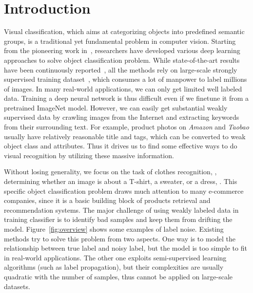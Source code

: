 \documentclass[10pt,twocolumn,letterpaper]{article}
\begin{document}
\section{Introduction} %
\label{sec:introduction}
Visual classification, which aims at categorizing objects into predefined semantic groups, is a traditional yet fundamental problem in computer vision. Starting from the pioneering work in~\cite{krizhevsky2012imagenet}, researchers have developed various deep learning approaches to solve object classification problem. While state-of-the-art results have been continuously reported~\cite{zeiler2013visualizing,simonyan2014very,szegedy2014going}, all the methods rely on large-scale strongly supervised training dataset~\cite{deng2009imagenet}, which consumes a lot of manpower to label millions of images. In many real-world applications, we can only get limited well labeled data. Training a deep neural network is thus difficult even if we finetune it from a pretrained ImageNet model. However, we can easily get substantial weakly supervised data by crawling images from the Internet and extracting keywords from their surrounding text. For example, product photos on \emph{Amazon} and \emph{Taobao} usually have relatively reasonable title and tags, which can be converted to weak object class and attributes. Thus it drives us to find some effective ways to do visual recognition by utilizing these massive information.

Without losing generality, we focus on the task of clothes recognition, \ie, determining whether an image is about a T-shirt, a sweater, or a dress, \etc. This specific object classification problem draws much attention to many e-commerce companies, since it is a basic building block of products retrieval and recommendation systems.  The major challenge of using weakly labeled data in training classifier is to identify bad samples and keep them from drifting the model. Figure~\ref{fig:overview} shows some examples of label noise. Existing methods try to solve this problem from two aspects. One way is to model the relationship between true label and noisy label, but the model is too simple to fit in real-world applications. The other one exploits semi-supervised learning algorithms (such as label propagation), but their complexities are usually quadratic with the number of samples, thus cannot be applied on large-scale datasets.
\end{document}
